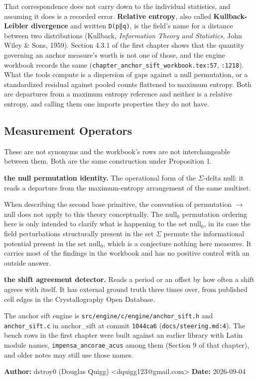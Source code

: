 That correspondence does not carry down to the individual statistics, and assuming it does is a recorded error. \textbf{Relative entropy}, also called \textbf{Kullback-Leibler divergence} and written \texttt{D(p‖q)}, is the field's name for a distance between two distributions (Kullback, \emph{Information Theory and Statistics}, John Wiley \& Sons, 1959). Section 4.3.1 of the first chapter shows that the quantity governing an anchor measure's worth is not one of those, and the engine workbook records the same (\texttt{chapter\_\allowbreak{}anchor\_\allowbreak{}sift\_\allowbreak{}workbook.\allowbreak{}tex:57}, \texttt{:1218}). What the tools compute is a dispersion of gaps against a null permutation, or a standardized residual against pooled counts flattened to maximum entropy. Both are departures from a maximum entropy reference and neither is a relative entropy, and calling them one imports properties they do not have.

\subsection{Measurement Operators}

\enlargethispage{4\baselineskip}

These are not synonyms and the workbook's rows are not interchangeable between them. Both are the same construction under Proposition 1.

\noindent\textbf{the null permutation identity.} The operational form of the \(\Sigma\)-delta null: it reads a departure from the maximum-entropy arrangement of the same multiset.

When describing the second base primitive, the convention of permutation \(\rightarrow\) null does not apply to this theory conceptually. The \(\text{null}_0\) permutation ordering here is only intended to clarify what is happening to the set \(\text{null}_0\), in its case the field perturbations structurally present in the set \(\Sigma\) permute the informational potential present in the set \(\text{null}_0\), which is a conjecture nothing here measures. It carries most of the findings in the workbook and has no positive control with an outside answer.

\noindent\textbf{the shift agreement detector.} Reads a period or an offset by how often a shift agrees with itself. It has external ground truth three times over, from published cell edges in the Crystallography Open Database.

The anchor sift engine is \texttt{src/\allowbreak{}engine/\allowbreak{}c/\allowbreak{}engine/\allowbreak{}anchor\_sift.h} and \texttt{anchor\_sift.c} in anchor\_sift at commit \texttt{1044ca6} (\texttt{docs/\allowbreak{}steering.md:4}). The bench rows in the first chapter were built against an earlier library with Latin module names, \texttt{impensa\_\allowbreak{}ancorae\_\allowbreak{}acus} among them (Section 9 of that chapter), and older notes may still use those names.

\textbf{Author:} dstroy0 (Douglas Quigg) <dquigg123@gmail.com> \textbf{Date:} 2026-09-04
